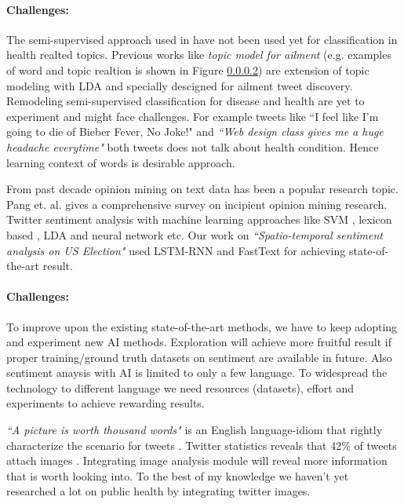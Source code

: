 \vspace{-2mm}
\paragraph{Challenges:}
The semi-supervised approach used in \cite{paul2017compass} have not been used yet for classification in health realted topics. Previous works like {\em topic model for ailment} \cite{paul2012model} (e.g. examples of word and topic realtion is shown in  Figure \ref{}) are extension of topic modeling with LDA and specially descigned for ailment tweet discovery. Remodeling semi-supervised classification for disease and health are yet to experiment and might face challenges.
For example tweets like {``I feel like I'm going to die of Bieber Fever, No Joke!"} and  {\em ``Web design class gives me a huge headache everytime"} both tweets does not talk about health condition. Hence learning context of words is desirable approach.

From past decade opinion mining on text data has been a popular research topic. Pang et. al. \cite{pang2008opinion} gives a comprehensive survey on incipient opinion mining research. Twitter sentiment analysis with machine learning approaches like SVM \cite{joachims1998text}, lexicon based \cite{taboada2011lexicon}, LDA \cite{duric2012feature,kouloumpis2011twitter} and neural network \cite{dos2014deep,tang2015document} etc. Our work on {\em ``Spatio-temporal sentiment analysis on US Election"} used LSTM-RNN {\em } and FastText for achieving state-of-the-art result.

\vspace{-2mm}
\paragraph{Challenges:}
To improve upon the existing state-of-the-art methods, we have to keep adopting and experiment new AI methods. Exploration will achieve more fruitful result if proper training/ground truth datasets on sentiment are available in future. Also sentiment anaysis with AI is limited to only a few language. To widespread the technology to different language we need resources (datasets), effort and experiments to achieve rewarding results.


{\em ``A picture is worth thousand words"}  is an English language-idiom that rightly characterize the scenario for tweets \cite{advice1911syracuse}. Twitter statistics reveals that 42\% of tweets attach images \cite{tweets_images}. Integrating image analysis module will reveal more information that is worth looking into.
To the best of my knowledge we haven't yet researched a lot on public health by integrating twitter images.

